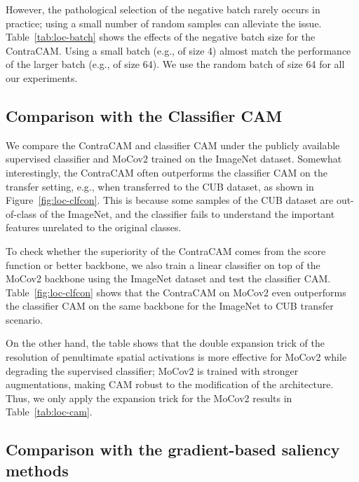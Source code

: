 

However, the pathological selection of the negative batch rarely occurs in practice; using a small number of random samples can alleviate the issue. Table~\ref{tab:loc-batch} shows the effects of the negative batch size for the ContraCAM. Using a small batch (e.g., of size 4) almost match the performance of the larger batch (e.g., of size 64). We use the random batch of size 64 for all our experiments.






\newpage
\subsection{Comparison with the Classifier CAM}
\label{sec:add-loc-cam}

We compare the ContraCAM and classifier CAM under the publicly available supervised classifier and MoCov2 trained on the ImageNet dataset. Somewhat interestingly, the ContraCAM often outperforms the classifier CAM on the transfer setting, e.g., when transferred to the CUB dataset, as shown in Figure~\ref{fig:loc-clfcon}. This is because some samples of the CUB dataset are out-of-class of the ImageNet, and the classifier fails to understand the important features unrelated to the original classes.



To check whether the superiority of the ContraCAM comes from the score function or better backbone, we also train a linear classifier on top of the MoCov2 backbone using the ImageNet dataset and test the classifier CAM. Table~\ref{fig:loc-clfcon} shows that the ContraCAM on MoCov2 even outperforms the classifier CAM on the same backbone for the ImageNet to CUB transfer scenario.

On the other hand, the table shows that the double expansion trick \citep{choe2020evaluating} of the resolution of penultimate spatial activations is more effective for MoCov2 while degrading the supervised classifier; MoCov2 is trained with stronger augmentations, making CAM robust to the modification of the architecture. Thus, we only apply the expansion trick for the MoCov2 results in Table~\ref{tab:loc-cam}.




\newpage
\subsection{Comparison with the gradient-based saliency methods}
\label{sec:add-loc-saliency}

